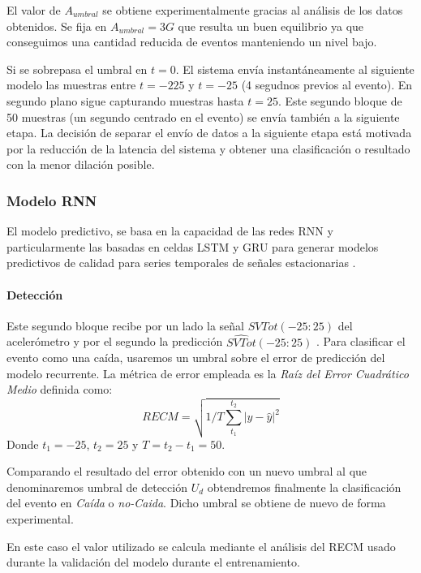 El valor de $A_{umbral}$ se obtiene experimentalmente gracias al análisis de los datos obtenidos. Se fija en $A_{umbral} = 3G$ que resulta un buen equilibrio ya que conseguimos una cantidad reducida de eventos manteniendo un nivel bajo. 

Si se sobrepasa el umbral en $t=0$. El sistema envía instantáneamente al siguiente modelo las muestras entre $t=-225$ y $t=-25$ (4 segudnos previos al evento). En segundo plano sigue capturando muestras hasta $t=25$. Este segundo bloque de 50 muestras (un segundo centrado en el evento) se envía también a la siguiente etapa. La decisión de separar el envío de datos a la siguiente etapa está motivada por la reducción de la latencia del sistema y obtener una clasificación o resultado con la menor dilación posible.


\subsubsection{Modelo RNN}


El modelo predictivo, se basa en la capacidad de las redes RNN y particularmente las basadas en celdas LSTM y GRU para generar modelos predictivos de calidad para series temporales de señales estacionarias \cite{Qin2019}.






\paragraph*{Detección}

Este segundo bloque recibe por un lado la señal $SVTot(-25:25)$ del acelerómetro y por el segundo la predicción $\hat{SVTot}(-25:25)$ . Para clasificar el evento como una caída, usaremos un umbral sobre el error de predicción del modelo recurrente. La métrica de error empleada es la \textit{Raíz del Error Cuadrático Medio} definida como: \[
RECM=\sqrt{1/T\sum_{t_1}^{t_2}|y-\hat{y}|^2 }
\]Donde $t_1 = -25$, $t_2 = 25$ y $T=t_2-t_1=50$.

Comparando el resultado del error obtenido con un nuevo umbral al que denominaremos umbral de detección $U_{d}$ obtendremos finalmente la clasificación del evento en \textit{Caída} o \textit{no-Caida}. Dicho umbral se obtiene de nuevo de forma experimental.

En este caso el valor utilizado se calcula mediante el análisis del RECM usado durante la validación del modelo durante el entrenamiento. 

